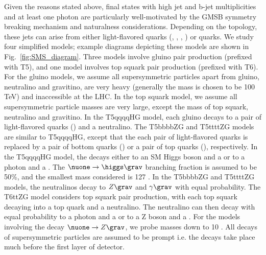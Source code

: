 Given the reasons stated above, final states with high jet and b-jet multiplicities and at least one photon
are particularly well-motivated by the GMSB symmetry breaking mechanism and naturalness considerations.
Depending on the topology, these jets can arise from either light-flavored quarks (\cPqu, \cPqd, \cPqs, \cPqc) or {\cPqb} quarks. We study 
four simplified models; example diagrams depicting these models are shown in Fig.~\ref{fig:SMS_diagram}.
Three models involve gluino pair production (prefixed with T5), and one model involves top squark pair production (prefixed with T6).
For the gluino models, we assume all supersymmetric particles apart from gluino, neutralino and gravitino, are very heavy (generally the 
mass is chosen to be 100 TeV) and inaccessible at the LHC. In the top squark model, we assume all supersymmetric particle masses
are very large, except the mass of top squark, neutralino and gravitino.
In the T5qqqqHG model, each gluino decays to a pair of light-flavored quarks (\qqbar) and a neutralino.  The T5bbbbZG and T5ttttZG models 
are similar to T5qqqqHG, except that the each pair of light-flavored quarks is replaced by a pair of bottom quarks (\bbbar) or a pair of 
top quarks (\ttbar), respectively. In the T5qqqqHG model, the \nuone decays either to an SM Higgs boson and a \grav or to a photon and a 
.  The $\nuone\to\higgs\grav$ branching fraction is assumed to be 50\%, and the smallest \nuone mass considered is 127 \gev. In 
the T5bbbbZG and T5ttttZG models, the neutralinos decay to $Z\grav$ and $\gamma\grav$ with equal probability. The T6ttZG model considers 
top squark pair production, with each top squark decaying into a top quark and a neutralino. The neutralino can then decay with equal 
probability to a photon and a \grav or to a Z boson and a \grav. For the models involving the decay $\nuone\to Z\grav$, we probe \nuone 
masses down to 10 \gev. All decays of supersymmetric particles are assumed to be prompt i.e. the decays take place much before the first 
layer of detector. 

